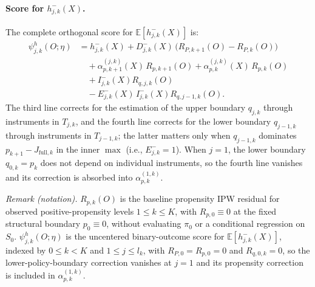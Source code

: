 \paragraph{Score for $h_{j,k}^{-}(X)$.} The complete orthogonal score for $\mathbb{E}[h_{j,k}^{-}(X)]$ is:
\begin{align*}
    \psi_{j,k}^{h}(O; \eta) &= h_{j,k}^{-}(X) + D_{j,k}^{-}(X)\,\big(R_{P,k+1}(O) - R_{P,k}(O)\big) \\
    &\quad + \alpha_{p,k+1}^{(j,k)}(X)\, R_{p,k+1}(O) + \alpha_{p,k}^{(j,k)}(X)\, R_{p,k}(O) \\
    &\quad + I_{j,k}^{-}(X) R_{q,j,k}(O) \\
    &\quad - E_{j,k}^{-}(X)\, I_{j,k}^{-}(X) R_{q,j-1,k}(O).
\end{align*}
The third line corrects for the estimation of the upper boundary $q_{j,k}$ through instruments in $T_{j,k}$, and the fourth line corrects for the lower boundary $q_{j-1,k}$ through instruments in $T_{j-1,k}$; the latter matters only when $q_{j-1,k}$ dominates $p_{k+1} - J_{\text{full},k}$ in the inner $\max$ (i.e., $E_{j,k}^{-} = 1$). When $j = 1$, the lower boundary $q_{0,k} = p_k$ does not depend on individual instruments, so the fourth line vanishes and its correction is absorbed into $\alpha_{p,k}^{(1,k)}$.

\noindent\textit{Remark (notation).} $R_{p,k}(O)$ is the baseline propensity IPW residual for observed positive-propensity levels $1\leqslant k\leqslant K$, with $R_{p,0}\equiv0$ at the fixed structural boundary $p_0\equiv0$, without evaluating $\pi_0$ or a conditional regression on $S_0$. $\psi_{j,k}^{h}(O;\eta)$ is the uncentered binary-outcome score for $\mathbb E[h_{j,k}^{-}(X)]$, indexed by $0\leq k<K$ and $1\leq j\leq l_k$, with $R_{P,0}=R_{p,0}=0$ and $R_{q,0,k}=0$, so the lower-policy-boundary correction vanishes at $j=1$ and its propensity correction is included in $\alpha_{p,k}^{(1,k)}$.


